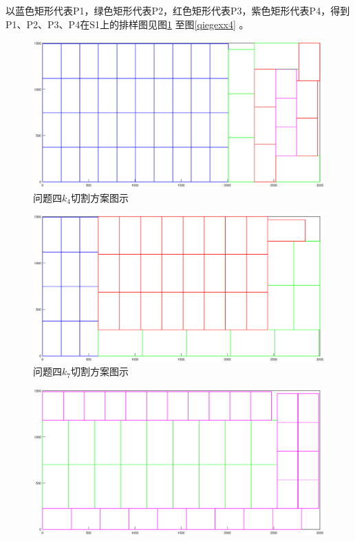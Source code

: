 \documentclass[hyperref,UTF8]{article}
\begin{document}
{ 以蓝色矩形代表P1，绿色矩形代表P2，红色矩形代表P3，紫色矩形代表P4，得到P1、P2、P3、P4在S1上的排样图见图\ref{qiegexx1}
 至图\ref{qiegexx4}
 。
 \begin{figure}[htbp]
  \centering
  \includegraphics[width=\textwidth]{picture/P3_1}
  \caption{问题四$k_4$切割方案图示 }\label{qiegexx1}
\end{figure}
\begin{figure}[htbp]
  \centering
  \includegraphics[width=\textwidth]{picture/P3_2}
  \caption{问题四$k_7$切割方案图示 }\label{qiegexx2}
\end{figure}
\begin{figure}[htbp]
  \centering
  \includegraphics[width=\textwidth]{picture/P3_3}

\end{figure}}
\end{document}
